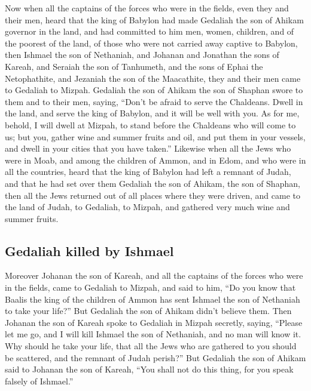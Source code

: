 \begin{paracol}{2}
\begin{otherlanguage}{english}
 Now when all the captains of the forces who were in the
fields, even they and their men, heard that the king of Babylon had made
Gedaliah the son of Ahikam governor in the land, and had committed to
him men, women, children, and of the poorest of the land, of those who
were not carried away captive to Babylon,  then Ishmael
the son of Nethaniah, and Johanan and Jonathan the sons of Kareah, and
Seraiah the son of Tanhumeth, and the sons of Ephai the Netophathite,
and Jezaniah the son of the Maacathite, they and their men came to
Gedaliah to Mizpah.  Gedaliah the son of Ahikam the son of
Shaphan swore to them and to their men, saying, ``Don't be afraid to
serve the Chaldeans. Dwell in the land, and serve the king of Babylon,
and it will be well with you.  As for me, behold, I will
dwell at Mizpah, to stand before the Chaldeans who will come to us; but
you, gather wine and summer fruits and oil, and put them in your
vessels, and dwell in your cities that you have taken.'' 
Likewise when all the Jews who were in Moab, and among the children of
Ammon, and in Edom, and who were in all the countries, heard that the
king of Babylon had left a remnant of Judah, and that he had set over
them Gedaliah the son of Ahikam, the son of Shaphan, 
then all the Jews returned out of all places where they were driven, and
came to the land of Judah, to Gedaliah, to Mizpah, and gathered very
much wine and summer fruits.

\hypertarget{gedaliah-killed-by-ishmael}{%
\subsection{Gedaliah killed by
Ishmael}\label{gedaliah-killed-by-ishmael}}

 Moreover Johanan the son of Kareah, and all the captains
of the forces who were in the fields, came to Gedaliah to Mizpah,
 and said to him, ``Do you know that Baalis the king of
the children of Ammon has sent Ishmael the son of Nethaniah to take your
life?'' But Gedaliah the son of Ahikam didn't believe them.
 Then Johanan the son of Kareah spoke to Gedaliah in
Mizpah secretly, saying, ``Please let me go, and I will kill Ishmael the
son of Nethaniah, and no man will know it. Why should he take your life,
that all the Jews who are gathered to you should be scattered, and the
remnant of Judah perish?''  But Gedaliah the son of
Ahikam said to Johanan the son of Kareah, ``You shall not do this thing,
for you speak falsely of Ishmael.''


\end{otherlanguage}
\end{paracol}
